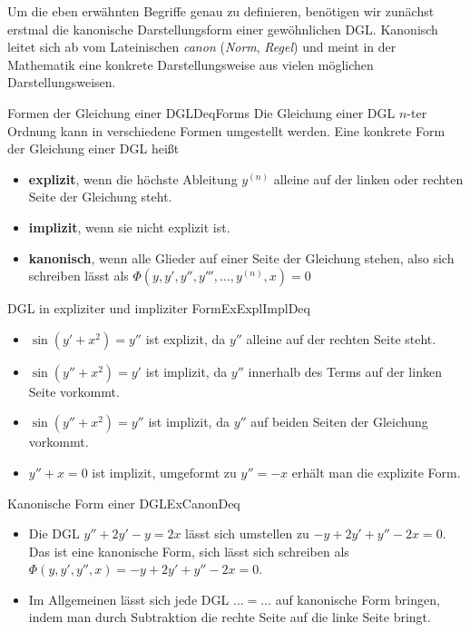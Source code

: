 Um die eben erwähnten Begriffe genau zu definieren, benötigen wir zunächst erstmal die kanonische Darstellungsform einer gewöhnlichen DGL. Kanonisch leitet sich ab vom Lateinischen \emph{canon} (\emph{Norm}, \emph{Regel}) und meint in der Mathematik eine konkrete Darstellungsweise aus vielen möglichen Darstellungsweisen.

\begin{definition}{Formen der Gleichung einer DGL}{DeqForms}
    Die Gleichung einer DGL $n$-ter Ordnung kann in verschiedene Formen umgestellt werden. Eine konkrete Form der Gleichung einer DGL heißt
    \begin{itemize}
        \item \textbf{explizit}, wenn die höchste Ableitung $y^{(n)}$ alleine auf der linken oder rechten Seite der Gleichung steht.
        \item \textbf{implizit}, wenn sie nicht explizit ist.
        \item \textbf{kanonisch}, wenn alle Glieder auf einer Seite der Gleichung stehen, also sich schreiben lässt als $\Phi(y,y',y'',y''',\dots,y^{(n)},x) = 0$
    \end{itemize}
\end{definition}

\begin{example}{DGL in expliziter und impliziter Form}{ExExplImplDeq}
    \begin{itemize}
        \item $\sin(y'+x^2) = y''$ ist explizit, da $y''$ alleine auf der rechten Seite steht.
        \item $\sin(y''+x^2) = y'$ ist implizit, da $y''$ innerhalb des Terms auf der linken Seite vorkommt.
        \item $\sin(y''+x^2) = y''$ ist implizit, da $y''$ auf beiden Seiten der Gleichung vorkommt.
        \item $y''+x=0$ ist implizit, umgeformt zu $y''=-x$ erhält man die explizite Form.
    \end{itemize}
\end{example}

\begin{example}{Kanonische Form einer DGL}{ExCanonDeq}
    \begin{itemize}
        \item Die DGL $y''+2y'-y=2x$ lässt sich umstellen zu $-y+2y'+y''-2x=0$. Das ist eine kanonische Form, sich lässt sich schreiben als $\Phi(y,y',y'',x)=-y+2y'+y''-2x=0$.
        \item Im Allgemeinen lässt sich jede DGL $\dots = \dots$ auf kanonische Form bringen, indem man durch Subtraktion die rechte Seite auf die linke Seite bringt.
    \end{itemize}
\end{example}

